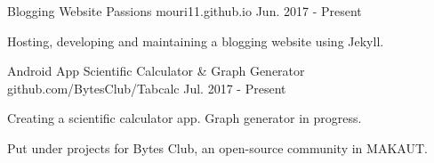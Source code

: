 


\begin{cventries}


\cventry
{Blogging Website} %
{Passions} %
{mouri11.github.io} %
{Jun. 2017 - Present} %
{ %
\begin{cvitems}
\item {Hosting, developing and maintaining a blogging website using Jekyll.}
\end{cvitems}
}


\cventry
{Android App} %
{Scientific Calculator \& Graph Generator} %
{github.com/BytesClub/Tabcalc} %
{Jul. 2017 - Present} %
{ %
\begin{cvitems}
\item {Creating a scientific calculator app. Graph generator in progress.}
\item {Put under projects for Bytes Club, an open-source community in MAKAUT.}
\end{cvitems}
}


\end{cventries}